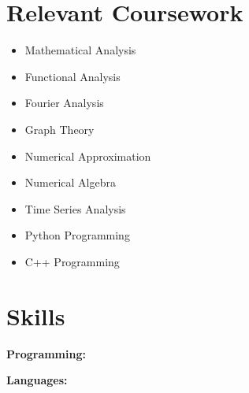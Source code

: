 \documentclass[a4paper,11pt]{article}
\newcommand{\resumeItem}[2]{
  \item\small{
    \textbf{#1}{: #2 \vspace{-2pt}}
  }
}
\newcommand{\resumeSubItem}[2]{\resumeItem{#1}{#2}\vspace{-3pt}}
\newcommand{\resumeSubHeadingListStart}{\begin{itemize}[leftmargin=*]}
\newcommand{\resumeSubHeadingListEnd}{\end{itemize}}
\begin{document}
\section{\bfseries{Relevant Coursework}}
\begin{multicols}{3}
    \begin{itemize}
        \item\small Mathematical Analysis
        \item\small Functional Analysis
        \item\small Fourier Analysis
        \item\small Graph Theory 
        \item\small Numerical Approximation
        \item\small Numerical Algebra
        \item\small Time Series Analysis 
        \item\small Python Programming
        \item\small C++ Programming 
    \end{itemize}
\end{multicols}
\vspace{2pt}
\section{\bfseries{Skills}}

\begin{description}[font=$\bullet$]
    \item   \textbf{Programming:}
    \vspace{2pt}
    \item   \textbf{Languages:}
\end{description}
\end{document}
